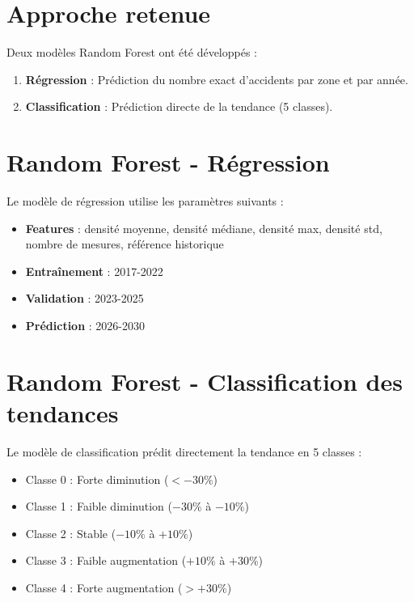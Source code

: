 \documentclass[12pt, a4paper]{report}
\begin{document}
\section{Approche retenue}

Deux modèles Random Forest ont été développés :

\begin{enumerate}
    \item \textbf{Régression} : Prédiction du nombre exact d'accidents par zone et par année.
    \item \textbf{Classification} : Prédiction directe de la tendance (5 classes).
\end{enumerate}

\section{Random Forest - Régression}

Le modèle de régression utilise les paramètres suivants :

\begin{itemize}
    \item \textbf{Features} : densité moyenne, densité médiane, densité max, densité std, nombre de mesures, référence historique
    \item \textbf{Entraînement} : 2017-2022
    \item \textbf{Validation} : 2023-2025
    \item \textbf{Prédiction} : 2026-2030
\end{itemize}

\section{Random Forest - Classification des tendances}

Le modèle de classification prédit directement la tendance en 5 classes :

\begin{itemize}
    \item Classe 0 : Forte diminution ($< -30\%$)
    \item Classe 1 : Faible diminution ($-30\%$ à $-10\%$)
    \item Classe 2 : Stable ($-10\%$ à $+10\%$)
    \item Classe 3 : Faible augmentation ($+10\%$ à $+30\%$)
    \item Classe 4 : Forte augmentation ($> +30\%$)
\end{itemize}
\end{document}
